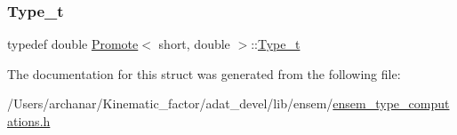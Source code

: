 \subsubsection{\texorpdfstring{Type\_t}{Type\_t}\hspace{0.1cm}{\footnotesize\ttfamily [2/2]}}
{\footnotesize\ttfamily typedef double \mbox{\hyperlink{structPromote}{Promote}}$<$ short, double $>$\+::\mbox{\hyperlink{structPromote_3_01short_00_01double_01_4_ac1a01602078262e2918f806dee9199c4}{Type\+\_\+t}}}



The documentation for this struct was generated from the following file\+:\begin{DoxyCompactItemize}
\item 
/\+Users/archanar/\+Kinematic\+\_\+factor/adat\+\_\+devel/lib/ensem/\mbox{\hyperlink{lib_2ensem_2ensem__type__computations_8h}{ensem\+\_\+type\+\_\+computations.\+h}}\end{DoxyCompactItemize}
